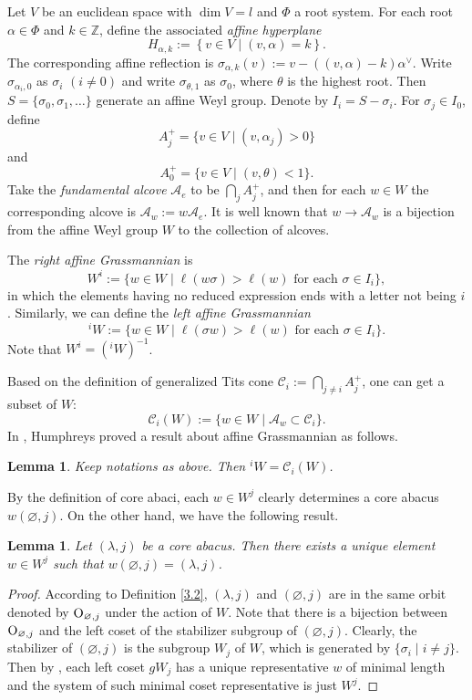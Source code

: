\documentclass[11pt]{amsart}
\theoremstyle{plain}
\numberwithin{equation}{subsection}
\newtheorem{lemma}[theorem]{Lemma}
\newcommand{\lam}{\lambda}
\begin{document}
Let $V$ be an euclidean space with $\dim V=l$ and $\Phi$ a root system. For each root $\alpha\in \Phi$ and $k\in \mathbb{Z}$, 
define the associated {\em affine hyperplane} 
$$H_{\alpha, k}:=\left\{v\in V \mid (v,\alpha)=k \right\}.$$
The corresponding affine reflection is $\sigma_{\alpha, k}(v):=v-((v,\alpha)-k)\alpha^{\vee}$.
Write $\sigma_{\alpha_i, 0}$ as $\sigma_i$ $(i\neq 0)$ and write $\sigma_{\theta, 1}$ as $\sigma_0$, where $\theta$ is the highest root. 
Then $S=\{\sigma_0, \sigma_1, \dots\}$ generate an affine Weyl group.
Denote by $I_i=S-\sigma_i$. For $\sigma_j\in I_0$, define $$A_{j}^+=\{v\in V\mid (v, \alpha_j)>0\}$$ and
$$A_{0}^+=\{v\in V\mid (v, \theta)<1\}.$$
Take the {\em fundamental alcove} $\mathcal{A}_e$ to be $\bigcap_{j} A_{j}^+$, and then for each $w\in W$ 
the corresponding alcove is $\mathcal{A}_w:=w\mathcal{A}_e$. It is well known that $w\longrightarrow \mathcal{A}_w$
is a bijection from the affine Weyl group $W$ to the collection of alcoves.

The {\em right affine Grassmannian} is $$W^i:=\{w\in W\mid \ell(w\sigma)>\ell(w)\,\, \text{for each}\,\, \sigma\in I_i\},$$ 
in which the elements having no reduced expression ends with a letter not being $i$. Similarly, we can define the
{\em left affine Grassmannian} $$^i W:=\{w\in W\mid \ell(\sigma w)>\ell(w)\,\, \text{for each}\,\, \sigma\in I_i\}.$$
Note that $W^i=(^i W)^{-1}$.

Based on the definition of generalized Tits cone $\mathcal{C}_i:=\bigcap_{j\neq i} A_{j}^+$, one can get a subset of $W$: 
$$\mathcal{C}_i(W):=\{w\in W\mid \mathcal{A}_w\subset \mathcal{C}_i\}.$$ In \cite{H}, Humphreys proved a result about affine Grassmannian as follows.

\begin{lemma}\cite[Lemma 5.13]{H}\label{3.11}
Keep notations as above. Then $^i W=\mathcal{C}_i(W)$.
\end{lemma}

By the definition of core abaci, each $w\in W^j$ clearly determines a core abacus $w(\varnothing, j)$. 
On the other hand, we have the following result.

\begin{lemma}\label{3.12}
Let $(\lam, j)$ be a core abacus. Then there exists a unique element $w\in W^j$ such that $w(\varnothing, j)=(\lam, j)$. 
\end{lemma}

\begin{proof}
According to Definition \ref{3.2}, $(\lam, j)$ and $(\varnothing, j)$ are in the same orbit denoted by ${\rm O}_{\varnothing, j}$ under the action of $W$.
Note that there is a bijection between ${\rm O}_{\varnothing, j}$ and the left coset of the stabilizer subgroup of $(\varnothing, j)$.
Clearly, the stabilizer of $(\varnothing, j)$ is the subgroup $W_j$ of $W$, which is generated by $\{\sigma_i\mid i\neq j\}$.
Then by \cite[Corollary 2.4.5]{BB}, each left coset  $gW_j$ has a unique representative $w$ of minimal length and the 
system of such minimal coset representative is just $W^j$. 
\end{proof}
\end{document}
